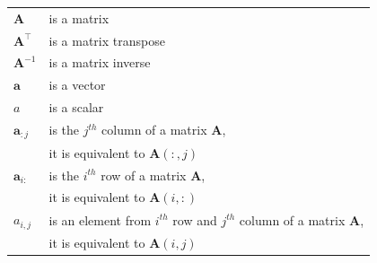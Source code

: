 \documentclass[10pt,twocolumn]{article}
\begin{document}
\begin{tabular}{ll}
    $\mathbf{A}$ & is a matrix \\
     $\mathbf{A}^{\top}$ & is a matrix transpose \\
     $\mathbf{A}^{-1}$ & is a matrix inverse \\
     $\mathbf{a}$ & is a vector \\
     $a$ & is a scalar \\
    $\mathbf{a}_{:j}$ & is the $j^{th}$ column of a matrix $\mathbf{A}$, \\
    & it is equivalent to  $\mathbf{A}(:,j)$ \\
    $\mathbf{a}_{i:}$ & is the $i^{th}$ row of a matrix $\mathbf{A}$, \\
    & it is equivalent to  $\mathbf{A}(i,:)$ \\
    $a_{i,j}$ & is an element from $i^{th}$ row and $j^{th}$ column of a matrix $\mathbf{A}$, \\ 
    & it is equivalent to  $\mathbf{A}(i,j)$ \\
\end{tabular}

%
%
%
%
%
%
%

\newpage
\end{document}
